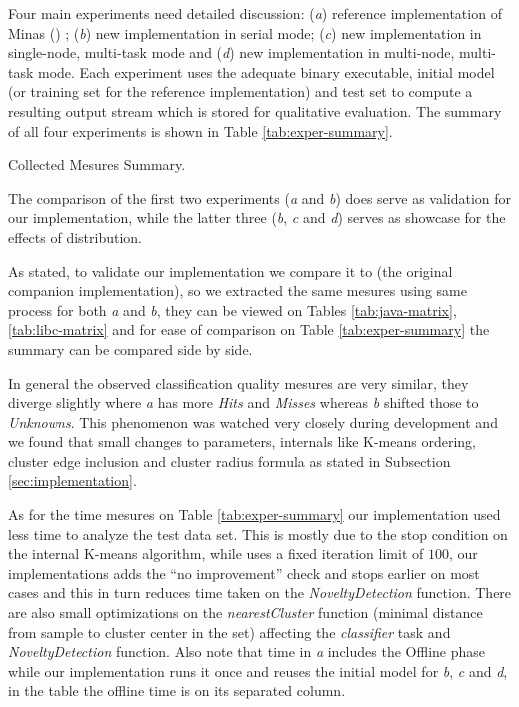Four main experiments need detailed discussion:
(\emph{a}) reference implementation of Minas () \cite{Faria2015minas};
(\emph{b}) new implementation in serial mode;
(\emph{c}) new implementation in single-node, multi-task mode and
(\emph{d}) new implementation in multi-node, multi-task mode.
Each experiment uses the adequate binary executable, initial model
(or training set for the reference implementation) and test set
to compute a resulting output stream which is stored for qualitative evaluation.
The summary of all four experiments is shown in Table \ref{tab:exper-summary}.

\begin{table}[hbt]
\begin{center}
  \caption{Collected Mesures Summary.}
  \label{tab:exper-summary}
  
\end{center}
\end{table}

The comparison of the first two experiments (\emph{a} and \emph{b}) does serve as
validation for our implementation, while the latter three (\emph{b}, \emph{c}
and \emph{d}) serves as showcase for the effects of distribution.

As stated, to validate our implementation we compare it to 
(the original \minas companion implementation), so we extracted the same mesures
using same process for both \emph{a} and \emph{b}, they can be viewed on
Tables \ref{tab:java-matrix}, \ref{tab:libc-matrix} and for ease of comparison
on Table \ref{tab:exper-summary} the summary can be compared side by side.

In general the observed classification quality mesures are very similar,
they diverge slightly where \emph{a} has more \emph{Hits} and \emph{Misses}
whereas \emph{b} shifted those to \emph{Unknowns}.
This phenomenon was watched very closely during development and we found that
small changes to \minas parameters, \minas internals like K-means ordering,
cluster edge inclusion and cluster radius formula as stated in
Subsection \ref{sec:implementation}.

As for the time mesures on Table \ref{tab:exper-summary}
our implementation used less time to analyze the test data set.
This is mostly due to 
the stop condition
on the internal K-means algorithm, while  uses a fixed iteration
limit of $100$, our implementations adds the ``no improvement'' check
and stops earlier on most cases and this in turn reduces time taken
on the \emph{NoveltyDetection} function.
There are also small optimizations on the \emph{nearestCluster} function
(minimal distance from sample to cluster center in the set)
affecting the \emph{classifier} task and \emph{NoveltyDetection} function.
Also note that  time in \emph{a} includes the Offline phase while our
implementation runs it once and reuses the initial model for \emph{b}, \emph{c}
and \emph{d}, in the table the offline time is on its separated column.

